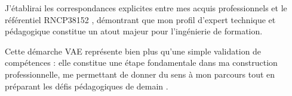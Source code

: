 J'établirai les correspondances explicites entre mes acquis professionnels et le référentiel RNCP38152 \parencite{rncp38152}, démontrant que mon profil d'expert technique et pédagogique constitue un atout majeur pour l'ingénierie de formation.

\vspace{1cm}

Cette démarche VAE représente bien plus qu'une simple validation de compétences : elle constitue une étape fondamentale dans ma construction professionnelle, me permettant de donner du sens à mon parcours tout en préparant les défis pédagogiques de demain \parencite{schon_reflective_practitioner}.